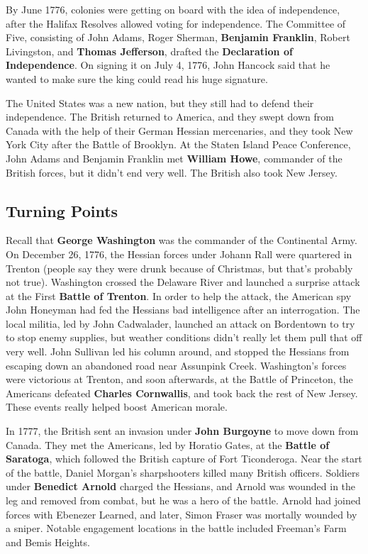 By June 1776, colonies were getting on board with the idea of independence,
after the Halifax Resolves allowed voting for independence.
The Committee of Five, consisting of
John Adams,
Roger Sherman,
\textbf{Benjamin Franklin},
Robert Livingston,
and \textbf{Thomas Jefferson},
drafted the \textbf{Declaration of Independence}.
On signing it on July 4, 1776,
John Hancock said that he wanted to make sure the king could read his huge signature.

The United States was a new nation, but they still had to defend their independence.
The British returned to America, and they swept down from Canada with the help of their German Hessian mercenaries,
and they took New York City after the Battle of Brooklyn.
At the Staten Island Peace Conference, John Adams and Benjamin Franklin met \textbf{William Howe},
commander of the British forces, but it didn't end very well.
The British also took New Jersey.

\subsection*{Turning Points}

Recall that \textbf{George Washington} was the commander of the Continental Army.
On December 26, 1776, the Hessian forces under Johann Rall were quartered in Trenton
(people say they were drunk because of Christmas, but that's probably not true).
Washington crossed the Delaware River and launched a surprise attack at the First \textbf{Battle of Trenton}.
In order to help the attack,
the American spy John Honeyman had fed the Hessians bad intelligence after an interrogation.
The local militia, led by John Cadwalader, launched an attack on Bordentown to try to stop enemy supplies,
but weather conditions didn't really let them pull that off very well.
John Sullivan led his column around,
and stopped the Hessians from escaping down an abandoned road near Assunpink Creek.
Washington's forces were victorious at Trenton,
and soon afterwards, at the Battle of Princeton, the Americans defeated \textbf{Charles Cornwallis},
and took back the rest of New Jersey.
These events really helped boost American morale.

In 1777, the British sent an invasion under \textbf{John Burgoyne} to move down from Canada.
They met the Americans, led by Horatio Gates, at the \textbf{Battle of Saratoga},
which followed the British capture of Fort Ticonderoga.
Near the start of the battle, Daniel Morgan's sharpshooters killed many British officers.
Soldiers under \textbf{Benedict Arnold} charged the Hessians,
and Arnold was wounded in the leg and removed from combat, but he was a hero of the battle.
Arnold had joined forces with Ebenezer Learned,
and later, Simon Fraser was mortally wounded by a sniper.
Notable engagement locations in the battle included Freeman's Farm and Bemis Heights.

